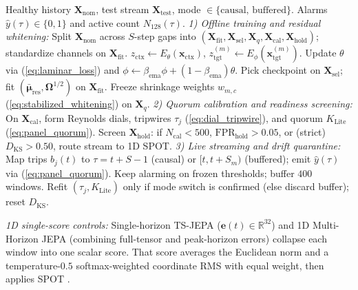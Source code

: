 \begin{algorithm}[t]
\caption{Laminar-JEPA-Lite, Screening, and Quarantine\label{alg:pipeline}}
\small
\begin{algorithmic}[1]
\Require Healthy history $\mathbf{X}_{\text{nom}}$, test stream $\mathbf{X}_{\text{test}}$, mode $\in\{\text{causal},\,\text{buffered}\}$.
\Ensure Alarms $\hat{y}(\tau)\in\{0,1\}$ and active count $N_{128}(\tau)$.
\Statex \textit{1) Offline training and residual whitening:}
\State Split $\mathbf{X}_{\text{nom}}$ across $S$-step gaps into $(\mathbf{X}_{\text{fit}}, \mathbf{X}_{\text{sel}}, \mathbf{X}_q, \mathbf{X}_{\text{cal}}, \mathbf{X}_{\text{hold}})$; standardize channels on $\mathbf{X}_{\text{fit}}$.
    \State $z_{\text{ctx}} \leftarrow E_\theta(\mathbf{x}_{\text{ctx}})$, \; $z_{\text{tgt}}^{(m)} \leftarrow E_\phi(\mathbf{x}_{\text{tgt}}^{(m)})$.
    \State Update $\theta$ via (\ref{eq:laminar_loss}) and $\phi \leftarrow \beta_{\text{ema}}\phi + (1{-}\beta_{\text{ema}})\theta$.
\EndFor
\State Pick checkpoint on $\mathbf{X}_{\text{sel}}$; fit $(\bar{\bm{\mu}}_{\text{res}}, \mathbf{\Omega}^{1/2})$ on $\mathbf{X}_{\text{fit}}$.
\State Freeze shrinkage weights $w_{m,c}$ (\ref{eq:stabilized_whitening}) on $\mathbf{X}_q$.
\Statex \textit{2) Quorum calibration and readiness screening:}
\State On $\mathbf{X}_{\text{cal}}$, form Reynolds dials, tripwires $\tau_j$ (\ref{eq:dial_tripwire}), and quorum $K_{\text{Lite}}$ (\ref{eq:panel_quorum}).
\State Screen $\mathbf{X}_{\text{hold}}$: if $N_{\text{cal}}{<}500$, $\text{FPR}_{\text{hold}}{>}0.05$, or (strict) $D_{\text{KS}}{>}0.50$, route stream to 1D SPOT.
\Statex \textit{3) Live streaming and drift quarantine:}
\For{each stride-$1$ window $[t{-}C,\,t{+}S)$ on $\mathbf{X}_{\text{test}}$}
    \State Map trips $b_j(t)$ to $\tau{=}t{+}S{-}1$ (causal) or $[t,t{+}S_m)$ (buffered); emit $\hat{y}(\tau)$ via (\ref{eq:panel_quorum}).
        \State Keep alarming on frozen thresholds; buffer $400$ windows.
        \State Refit $(\tau_j, K_{\text{Lite}})$ only if mode switch is confirmed (else discard buffer); reset $D_{\text{KS}}$.
    \EndIf
\EndFor
\end{algorithmic}
\end{algorithm}

\noindent\emph{1D single-score controls:} Single-horizon TS-JEPA ($\mathbf{e}(t) \in \mathbb{R}^{32}$) and 1D Multi-Horizon JEPA (combining full-tensor and peak-horizon errors) collapse each window into one scalar score. That score averages the Euclidean norm and a temperature-$0.5$ softmax-weighted coordinate RMS with equal weight, then applies SPOT \cite{siffer2017anomaly, balkema1974residual, grimshaw1993computing}.
